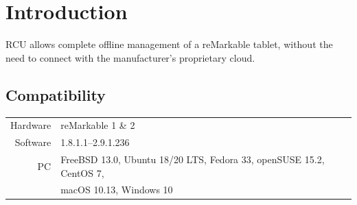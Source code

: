 \documentclass{memoir}
\begin{document}
{%






\setcounter{chapter}{0}
\renewcommand{\thechapter}{\arabic{chapter}}
\chapter{Introduction}
\setcounter{page}{1}

RCU allows complete offline management of a reMarkable tablet, without the need to connect with the manufacturer's proprietary cloud.

\section{Compatibility}
\label{sec:compatibility}
\begin{tabular}{ r | l }
  Hardware & reMarkable 1 \& 2 \\
  Software & 1.8.1.1--2.9.1.236 \\
  PC & FreeBSD 13.0, Ubuntu 18/20 LTS, Fedora 33, openSUSE 15.2, CentOS 7, \\
  & macOS 10.13, Windows 10 \\
\end{tabular}


}
\end{document}
